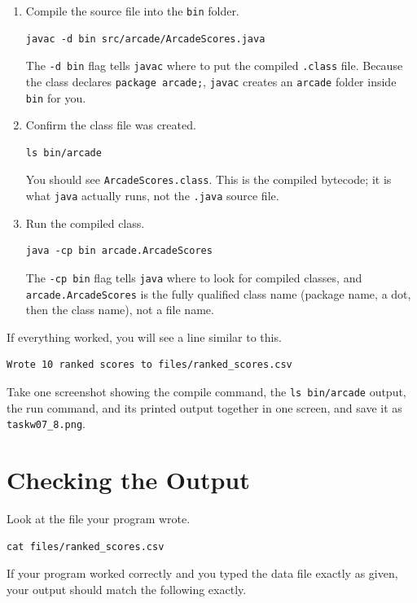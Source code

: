 \documentclass[11pt]{article}
\begin{document}
\begin{enumerate}[itemsep=2pt]
  \item Compile the source file into the \texttt{bin} folder.
\begin{lstlisting}[language={}]
javac -d bin src/arcade/ArcadeScores.java
\end{lstlisting}
    The \texttt{-d bin} flag tells \texttt{javac} where to put the compiled
    \texttt{.class} file. Because the class declares
    \texttt{package arcade;}, \texttt{javac} creates an \texttt{arcade}
    folder inside \texttt{bin} for you.
  \item Confirm the class file was created.
\begin{lstlisting}[language={}]
ls bin/arcade
\end{lstlisting}
    You should see \texttt{ArcadeScores.class}. This is the compiled
    bytecode; it is what \texttt{java} actually runs, not the \texttt{.java}
    source file.
  \item Run the compiled class.
\begin{lstlisting}[language={}]
java -cp bin arcade.ArcadeScores
\end{lstlisting}
    The \texttt{-cp bin} flag tells \texttt{java} where to look for compiled
    classes, and \texttt{arcade.ArcadeScores} is the fully qualified class
    name (package name, a dot, then the class name), not a file name.
\end{enumerate}

If everything worked, you will see a line similar to this.

\begin{lstlisting}[language={}]
Wrote 10 ranked scores to files/ranked_scores.csv
\end{lstlisting}

Take one screenshot showing the compile command, the \texttt{ls bin/arcade}
output, the run command, and its printed output together in one screen, and
save it as \texttt{taskw07\_8.png}.

\section{Checking the Output}

Look at the file your program wrote.

\begin{lstlisting}[language={}]
cat files/ranked_scores.csv
\end{lstlisting}

If your program worked correctly and you typed the data file exactly as
given, your output should match the following exactly.
\end{document}
